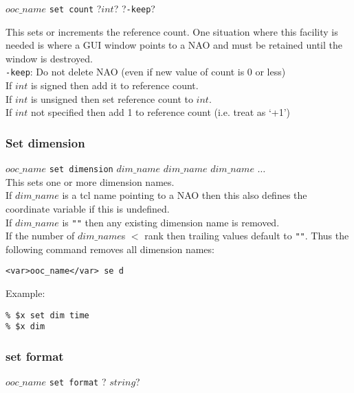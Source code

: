   $ooc\_name$ \texttt{set count} ?$int$? ?\texttt{-keep}?

This sets or increments the reference count. One situation where
  this facility is needed is where a GUI window points to a NAO and
  must be retained until the window is destroyed.
  \\
  \texttt{-keep}: Do not delete NAO (even if new value of count is 0 or less)
  \\
If $int$ is signed then add it to reference count.
  \\
If $int$ is unsigned then set reference count to $int$.
  \\
If $int$ not specified then add 1 to reference count (i.e.  treat as `+1')

  \subsubsection{
    \label{set-dimension}Set dimension
  }

  


  $ooc\_name$ 
  \texttt{set dimension} 
  $dim\_name$ 
  $dim\_name$ 
  $dim\_name$ $\ldots$
  \\
  

This sets one or more dimension names.
  \\If 
  $dim\_name$ is a tcl name pointing to a NAO then this also
  defines the coordinate variable if this is undefined.
  \\If 
  $dim\_name$ is 
  \texttt{""} then any existing dimension name is
  removed.
  \\If the number of 
  $dim\_name$s $<$ rank then trailing values default to 
  \texttt{""}. Thus the following command removes all
  dimension names:
  \begin{verbatim}
<var>ooc_name</var> se d
\end{verbatim}

  

Example:
  \begin{verbatim}
% $x set dim time
% $x dim
\end{verbatim}

  \subsubsection{
    \label{set-format}set format
  }

  


  $ooc\_name$ 
  \texttt{set format} ?
  $string$?
  \\
  

